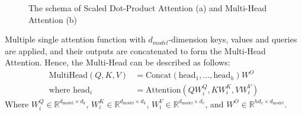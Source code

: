 \begin{figure}[htbp]
    \centering
    \hfill
    \caption{The schema of Scaled Dot-Product Attention (a) \cite{vaswani_attention_2023} and Multi-Head Attention (b) \cite{vaswani_attention_2023}}
    \label{fig:attention}
\end{figure}
Multiple single attention function with $d_{model}$-dimension keys, values and queries are applied, and their outputs are concatenated to form the Multi-Head Attention. Hence, the Multi-Head can be described as follows:
\begin{equation}
\begin{aligned}
\text{MultiHead}(Q, K, V) &= \text{Concat}(\text{head}_1, \ldots, \text{head}_h) W^O \\
\text{where } \text{head}_i &= \text{Attention}(Q W_i^Q, K W_i^K, V W_i^V)
\end{aligned}
\end{equation}
Where $W_i^Q \in \mathbb{R}^{d_{\text{model}} \times d_k}$, $W_i^K \in \mathbb{R}^{d_{\text{model}} \times d_k}$, $W_i^V \in \mathbb{R}^{d_{\text{model}} \times d_v}$, and $W^O \in \mathbb{R}^{h d_v \times d_{\text{model}}}$.

